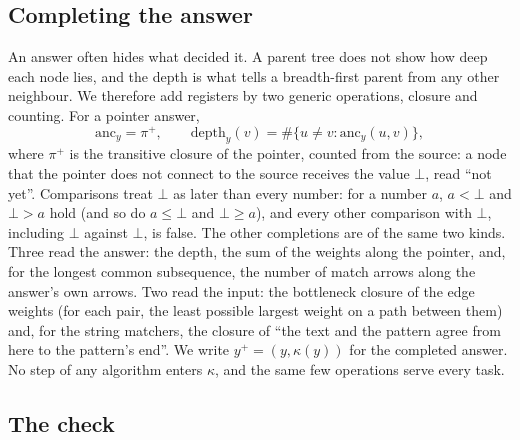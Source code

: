 \documentclass[10pt]{article}
\newcommand{\notyet}{\bot}
\begin{document}
\subsection{Completing the answer}

An answer often hides what decided it. A parent tree does not show how deep each node lies, and the depth is what tells
a breadth-first parent from any other neighbour. We therefore add registers by two generic operations, closure and
counting. For a pointer answer,
\begin{equation}
\mathrm{anc}_y = \pi^{+}, \qquad \mathrm{depth}_y(v) = \#\{u \neq v : \mathrm{anc}_y(u,v)\},
\label{eq:completion}
\end{equation}
where $\pi^{+}$ is the transitive closure of the pointer, counted from the source: a node that the pointer does not
connect to the source receives the value $\notyet$, read ``not yet''. Comparisons treat $\notyet$ as later than every
number: for a number $a$, $a < \notyet$ and $\notyet > a$ hold (and so do $a \leq \notyet$ and $\notyet \geq a$), and
every other comparison with $\notyet$, including $\notyet$ against $\notyet$, is false. The other completions are of the
same two kinds. Three read the answer: the depth, the sum of the weights along the pointer, and, for the longest common
subsequence, the number of match arrows along the answer's own arrows. Two read the input: the bottleneck closure of the
edge weights (for each pair, the least possible largest weight on a path between them) and, for the string matchers, the
closure of ``the text and the pattern agree from here to the pattern's end''. We write $y^{+} = (y, \kappa(y))$ for the
completed answer. No step of any algorithm enters $\kappa$, and the same few operations serve every task.

\subsection{The check}
\end{document}
